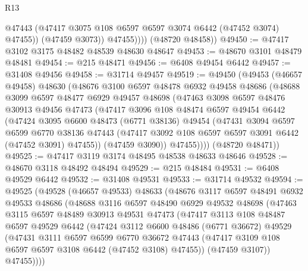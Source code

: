 \begin{lexlean}{R13}
\begin{coremodule}
                  @47443
                  (@47417 @3075 @108 @6597 @6597 @3074 @6442 (@47452 @3074) @47455))
                (@47459 @3073))
              @47455))))
      (@48720 @48458))
@49450 := @47417 @3102 @3175 @48482 @48539 @48630 @48647
@49453 := @48670 @3101 @48479 @48481
@49454 := @215 @48471
@49456 := @6408 @49454 @6442
@49457 := @31408 @49456
@49458 := @31714 @49457
@49519 := @49450
    (@49453
      (@46657 @49458)
      @48630
      (@48676
        @3100
        @6597
        @48478
        @6932
        @49458
        @48686
        (@48688
          @3099
          @6597
          @48477
          @6929
          @49457
          @48698
          (@47463
            @3098
            @6597
            @48476
            @30913
            @49456
            @47473
            (@47417
              @3096
              @108
              @48474
              @6597
              @49454
              @6442
              (@47424
                @3095
                @6600
                @48473
                (@6771 @38136)
                @49454
                (@47431
                  @3094
                  @6597
                  @6599
                  @6770
                  @38136
                  @47443
                  (@47417 @3092 @108 @6597 @6597 @3091 @6442 (@47452 @3091) @47455))
                (@47459 @3090))
              @47455))))
      (@48720 @48471))
@49525 := @47417 @3119 @3174 @48495 @48538 @48633 @48646
@49528 := @48670 @3118 @48492 @48494
@49529 := @215 @48484
@49531 := @6408 @49529 @6442
@49532 := @31408 @49531
@49533 := @31714 @49532
@49594 := @49525
    (@49528
      (@46657 @49533)
      @48633
      (@48676
        @3117
        @6597
        @48491
        @6932
        @49533
        @48686
        (@48688
          @3116
          @6597
          @48490
          @6929
          @49532
          @48698
          (@47463
            @3115
            @6597
            @48489
            @30913
            @49531
            @47473
            (@47417
              @3113
              @108
              @48487
              @6597
              @49529
              @6442
              (@47424
                @3112
                @6600
                @48486
                (@6771 @36672)
                @49529
                (@47431
                  @3111
                  @6597
                  @6599
                  @6770
                  @36672
                  @47443
                  (@47417 @3109 @108 @6597 @6597 @3108 @6442 (@47452 @3108) @47455))
                (@47459 @3107))
              @47455))))

\end{coremodule}
\end{lexlean}
